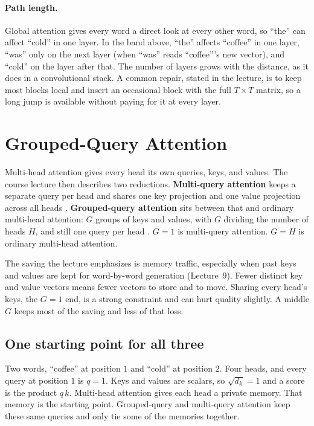 \documentclass[11pt]{article}
\begin{document}
\paragraph{Path length.}
Global attention gives every word a direct look at every other word, so
``the'' can affect ``cold'' in one layer. In the band above, ``the''
affects ``coffee'' in one layer, ``was'' only on the next layer (when
``was'' reads ``coffee'''s new vector), and ``cold'' on the layer after
that. The number of layers grows with the distance, as it does in a
convolutional stack. A common repair, stated in the lecture, is to keep
most blocks local and insert an occasional block with the full \(T\times T\)
matrix, so a long jump is available without paying for it at every layer.

\section{Grouped-Query Attention}
\label{sec:gqa}

Multi-head attention gives every head its own queries, keys, and values.
The course lecture then describes two reductions. \textbf{Multi-query
attention} keeps a separate query per head and shares one key projection
and one value projection across all heads \cite{shazeer2019fast}.
\textbf{Grouped-query attention} sits between that and ordinary multi-head
attention: \(G\) groups of keys and values, with \(G\) dividing the number
of heads \(H\), and still one query per head \cite{ainslie2023gqa}.
\(G=1\) is multi-query attention. \(G=H\) is ordinary multi-head attention.

The saving the lecture emphasizes is memory traffic, especially when past
keys and values are kept for word-by-word generation (Lecture~9). Fewer
distinct key and value vectors means fewer vectors to store and to move.
Sharing every head's keys, the \(G=1\) end, is a strong constraint and can
hurt quality slightly. A middle \(G\) keeps most of the saving and less of
that loss.

\subsection{One starting point for all three}

Two words, ``coffee'' at position \(1\) and ``cold'' at position \(2\).
Four heads, and every query at position \(1\) is \(q=1\). Keys and values
are scalars, so \(\sqrt{d_k}=1\) and a score is the product \(q\,k\).
Multi-head attention gives each head a private memory. That memory is the
starting point. Grouped-query and multi-query attention keep these same
queries and only tie some of the memories together.
\end{document}
